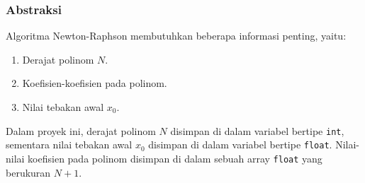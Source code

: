 \subsubsection{Abstraksi}
Algoritma Newton-Raphson membutuhkan beberapa informasi penting, yaitu:
\begin{enumerate}
    \item Derajat polinom $N$.
    \item Koefisien-koefisien pada polinom.
    \item Nilai tebakan awal $x_0$.
\end{enumerate}
Dalam proyek ini, derajat polinom $N$ disimpan di dalam variabel bertipe \lstinline|int|, sementara nilai tebakan awal $x_0$ disimpan di dalam variabel bertipe \lstinline|float|.
Nilai-nilai koefisien pada polinom disimpan di dalam sebuah array \lstinline|float| yang berukuran $N+1$. 



